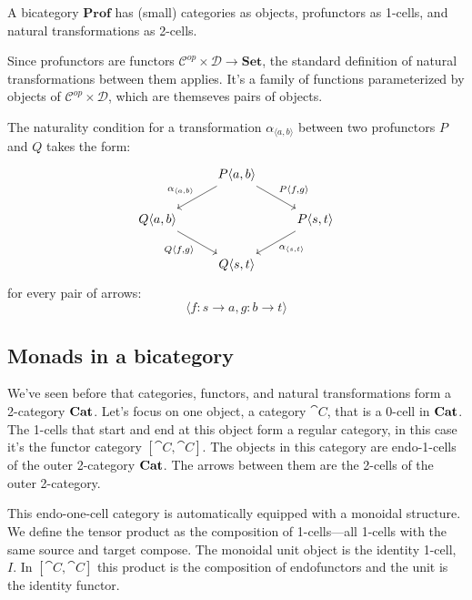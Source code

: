 \documentclass[DaoFP]{subfiles}
\begin{document}
A bicategory $\mathbf{Prof}$ has (small) categories as objects, profunctors as 1-cells, and natural transformations as 2-cells. 

Since profunctors are functors $\mathcal{C}^{op} \times  \mathcal{D} \to \mathbf{Set}$, the standard definition of natural transformations between them applies. It's a family of functions parameterized by objects of $\mathcal{C}^{op} \times  \mathcal{D}$, which are themseves pairs of objects. 

The naturality condition for a transformation $\alpha_{\langle a, b \rangle}$ between two profunctors $P$ and $Q$ takes the form:
\[
 \begin{tikzcd}
 &P \langle a, b \rangle
 \arrow[ld, "{\alpha_{\langle a, b \rangle}}"']
 \arrow[rd, "{P \langle f, g \rangle}"]
 \\
 Q \langle a, b \rangle
 \arrow[dr, "{Q \langle f, g \rangle}"']
 &&P \langle s, t \rangle
 \arrow[dl, "{\alpha_{\langle s, t \rangle}}"]
 \\
 & Q \langle s, t \rangle
 \end{tikzcd}
\]
for every pair of arrows:
\[ \langle f \colon s \to a, g \colon b \to t \rangle \]

\subsection{Monads in a bicategory}

We've seen before that categories, functors, and natural transformations form a 2-category $\mathbf{Cat}$. Let's focus on one object, a category $\cat C$, that is a 0-cell in $\mathbf{Cat}$. The 1-cells that start and end at this object form a regular category, in this case it's the functor category $[\cat C, \cat C]$. The objects in this category are endo-1-cells of the outer 2-category $\mathbf{Cat}$. The arrows between them are the 2-cells of the outer 2-category.

This endo-one-cell category is automatically equipped with a monoidal structure. We define the tensor product as the composition of 1-cells---all 1-cells with the same source and target compose. The monoidal unit object is the identity 1-cell, $I$. In $[\cat C, \cat C]$ this product is the composition of endofunctors and the unit is the identity functor. 
\end{document}
